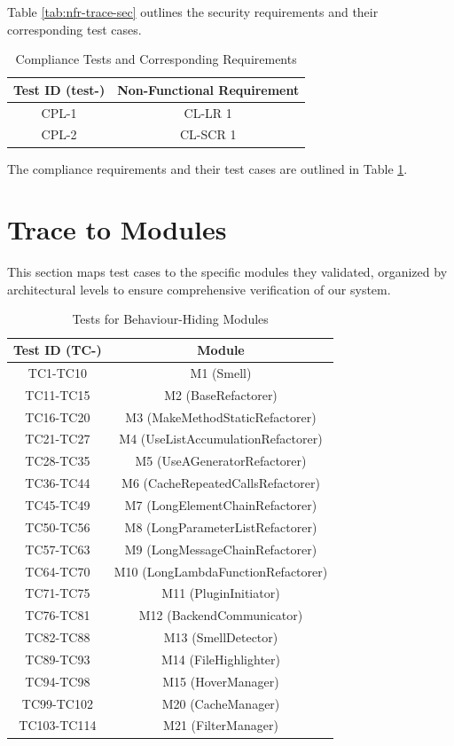 \documentclass[12pt, titlepage]{article}
\begin{document}
Table \ref{tab:nfr-trace-sec} outlines the security requirements and their corresponding test cases.

  \begin{table}[H]
    \centering
    \caption{Compliance Tests and Corresponding Requirements}
    \begin{tabular}{cc}
      \toprule \textbf{Test ID (test-)} & \textbf{Non-Functional Requirement} \\
      \midrule
      CPL-1 & CL-LR 1 \\
      CPL-2 & CL-SCR 1 \\
      \bottomrule
    \end{tabular}
    \label{tab:nfr-trace-comp}
  \end{table}

The compliance requirements and their test cases are outlined in Table \ref{tab:nfr-trace-comp}.

\section{Trace to Modules}

This section maps test cases to the specific modules they validated, organized by architectural levels to ensure comprehensive verification of our system.

\begin{table}[H]
  \centering
  \caption{Tests for Behaviour-Hiding Modules}
  \begin{tabular}{cc}
    \toprule \textbf{Test ID (TC-)} & \textbf{Module} \\
    \midrule
    TC1-TC10 & M1 (Smell) \\
    TC11-TC15 & M2 (BaseRefactorer) \\
    TC16-TC20 & M3 (MakeMethodStaticRefactorer) \\
    TC21-TC27 & M4 (UseListAccumulationRefactorer) \\
    TC28-TC35 & M5 (UseAGeneratorRefactorer) \\
    TC36-TC44 & M6 (CacheRepeatedCallsRefactorer) \\
    TC45-TC49 & M7 (LongElementChainRefactorer) \\
    TC50-TC56 & M8 (LongParameterListRefactorer) \\
    TC57-TC63 & M9 (LongMessageChainRefactorer) \\
    TC64-TC70 & M10 (LongLambdaFunctionRefactorer) \\
    TC71-TC75 & M11 (PluginInitiator) \\
    TC76-TC81 & M12 (BackendCommunicator) \\
    TC82-TC88 & M13 (SmellDetector) \\
    TC89-TC93 & M14 (FileHighlighter) \\
    TC94-TC98 & M15 (HoverManager) \\
    TC99-TC102 & M20 (CacheManager) \\
    TC103-TC114 & M21 (FilterManager) \\
    \bottomrule
  \end{tabular}
  \label{tab:behaviour_hiding_modules_tests}
\end{table}
\end{document}
